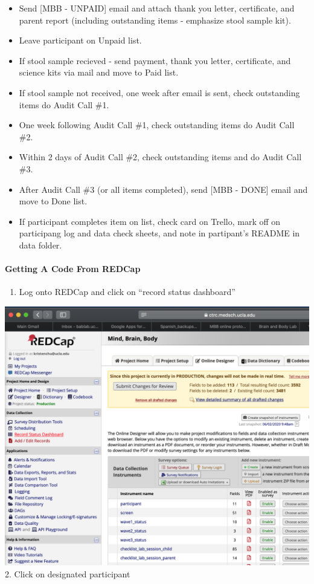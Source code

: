 \documentclass[]{book}
\providecommand{\tightlist}{%
  \setlength{\itemsep}{0pt}\setlength{\parskip}{0pt}}
\let\oldparagraph\paragraph
\renewcommand{\paragraph}[1]{\oldparagraph{#1}\mbox{}}
\begin{document}
\begin{itemize}
\tightlist
\item
  Send {[}MBB - UNPAID{]} email and attach thank you letter, certificate, and parent report (including outstanding items - emphasize stool sample kit).
\item
  Leave participant on Unpaid list.
\item
  If stool sample recieved - send payment, thank you letter, certificate, and science kits via mail and move to Paid list.
\item
  If stool sample not received, one week after email is sent, check outstanding items do Audit Call \#1.
\item
  One week following Audit Call \#1, check outstanding items do Audit Call \#2.
\item
  Within 2 days of Audit Call \#2, check outstanding items and do Audit Call \#3.
\item
  After Audit Call \#3 (or all items completed), send {[}MBB - DONE{]} email and move to Done list.
\item
  If participant completes item on list, check card on Trello, mark off on participang log and data check sheets, and note in partipant's README in data folder.
\end{itemize}

\hypertarget{getting-a-code-from-redcap}{%
\paragraph{Getting A Code From REDCap}\label{getting-a-code-from-redcap}}

\begin{enumerate}
\def\labelenumi{\arabic{enumi}.}
\tightlist
\item
  Log onto REDCap and click on ``record status dashboard''
\end{enumerate}

\includegraphics{images/redcap_code/1.png}
2. Click on designated participant
\end{document}
